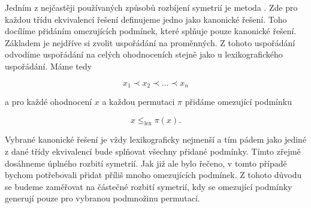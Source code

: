 Jedním z nejčastěji používaných způsobů rozbíjení symetrií je metoda  \cite{DBLP:reference/fai/GentPP06}\cite{Rossi2014-gr}. Zde pro každou třídu ekvivalencí řešení definujeme jedno jako kanonické řešení. Toho docílíme přidáním omezujících podmínek, které splňuje pouze kanonické řešení. Základem je nejdříve si zvolit uspořádání na proměnných. Z tohoto uspořádání odvodíme uspořádání na celých ohodnoceních stejně jako u lexikografického uspořádání. Máme tedy

$$x_1 \prec x_2 \prec \dots \prec x_n$$

a pro každé ohodnocení $x$ a každou permutaci $\pi$ přidáme omezující podmínku 

$$x \leq_{\text{lex}} \pi(x).$$

Vybrané kanonické řešení je vždy lexikograficky nejmenší a tím pádem jako jediné z dané třídy ekvivalencí bude splňovat všechny přidané podmínky. Tímto zřejmě dosáhneme úplného rozbití symetrií. Jak již ale bylo řečeno, v tomto případě bychom potřebovali přidat příliš mnoho omezujících podmínek. Z tohoto důvodu se budeme zaměřovat na částečné rozbití symetrií, kdy se omezující podmínky generují pouze pro vybranou podmnožinu permutací.